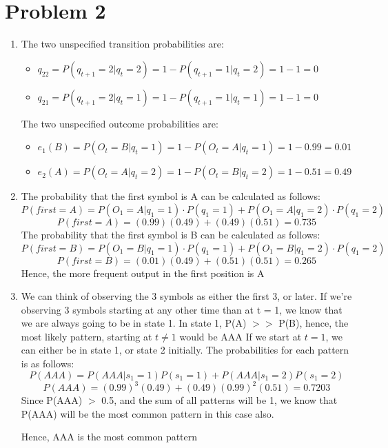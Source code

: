 \documentclass[11pt]{article}
\newcommand{\solution}[1]{{{\color{blue}{\bf Solution:} {#1}}}}
\begin{document}
\section{Problem 2}
\begin{enumerate}
\item \solution{} \newline
The two unspecified transition probabilities are: 
\begin{itemize}
	\item $q_{22} = P(q_{t+1} = 2 | q_t = 2) = 1 - P(q_{t+1} = 1 | q_t = 2) = 1 - 1 = 0$
	\item $q_{21} = P(q_{t+1} = 2 | q_t = 1) = 1 - P(q_{t+1} = 1 | q_t = 1) = 1 - 1 = 0$
\end{itemize}
The two unspecified outcome probabilities are:
\begin{itemize}
	\item $e_1 (B) = P(O_t = B | q_t = 1) = 1 - P(O_t = A | q_t = 1) = 1 - 0.99 = 0.01$
	\item $e_2 (A) = P(O_t = A | q_t = 2) = 1 - P(O_t = B | q_t = 2) = 1 - 0.51 = 0.49$ 
\end{itemize}

\item \solution{} \newline
The probability that the first symbol is A can be calculated as follows:
$$
P(first = A) = P(O_1 = A | q_1 = 1) \cdot P(q_1 = 1) + P(O_1 = A | q_1 = 2) \cdot P(q_1 = 2)
$$
$$
P(first = A) = (0.99) (0.49) + (0.49) (0.51) = 0.735
$$
The probability that the first symbol is B can be calculated as follows:
$$
P(first = B) = P(O_1 = B | q_1 = 1) \cdot P(q_1 = 1) + P(O_1 = B | q_1 = 2) \cdot P(q_1 = 2)
$$
$$
P(first = B) = (0.01) (0.49) + (0.51) (0.51) = 0.265
$$
Hence, the more frequent output in the first position is A

\item \solution{} \newline
We can think of observing the 3 symbols as either the first 3, or later.
If we're observing 3 symbols starting at any other time than at t = 1, we know
that we are always going to be in state 1.  \newline
In state 1, P(A) $>>$ P(B), hence, the most likely pattern, starting at $t\neq 1$ would be AAA \newline
If we start at $t=1$, we can either be in state 1, or state 2 initially. \newline
The probabilities for each pattern is as follows:
$$
P(AAA) = P(AAA|s_1 = 1)P(s_1 = 1) + P(AAA|s_1 = 2)P(s_1 = 2) 
$$
$$
P(AAA) = (0.99)^3 ( 0.49) + (0.49)(0.99)^2 (0.51) = 0.7203
$$			
Since P(AAA) $>$ 0.5, and the sum of all patterns will be 1, we know that P(AAA) will be the
most common pattern in this case also.

Hence, AAA is the most common pattern

\end{enumerate}
\end{document}
